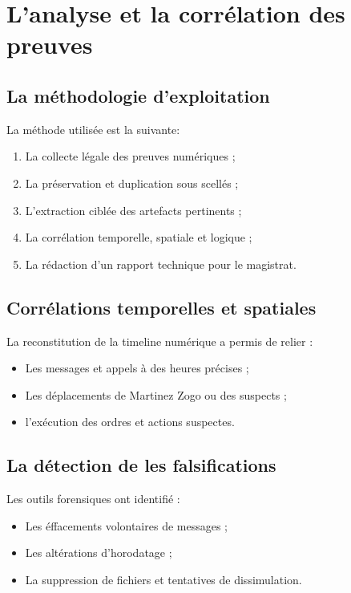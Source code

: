 \documentclass[12pt,a4paper]{report}
\begin{document}
\chapter{L'analyse et la corrélation des preuves}

\section{La méthodologie d’exploitation}
La méthode utilisée est la suivante:
\begin{enumerate}
    \item La collecte légale des preuves numériques ;
    \item La préservation et duplication sous scellés ;
    \item L'extraction ciblée des artefacts pertinents ;
    \item La corrélation temporelle, spatiale et logique ;
    \item La rédaction d’un rapport technique pour le magistrat.
\end{enumerate}

\section{Corrélations temporelles et spatiales}

La reconstitution de la timeline numérique a permis de relier : 
\begin{itemize}
    \item Les messages et appels à des heures précises ;
    \item Les déplacements de Martinez Zogo ou des suspects ;
    \item l'exécution des ordres et actions suspectes.
\end{itemize}

\section{La détection de les falsifications}

Les outils forensiques ont identifié : 
\begin{itemize}
    \item Les éffacements volontaires de messages ;
    \item Les altérations d’horodatage ;
    \item La suppression de fichiers et tentatives de dissimulation.
\end{itemize}
\end{document}
